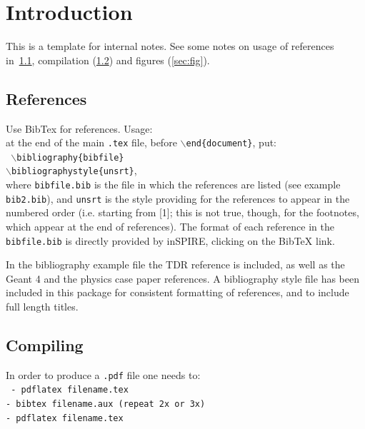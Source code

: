 \documentclass[preprint,prd,tightenlines]{revtex4}
\begin{document}
{\renewcommand{\thefootnote}{\fnsymbol{footnote}}}
\setcounter{footnote}{0}

\tableofcontents

\section{Introduction}

This is a template for {\belletwo} internal notes. See some notes on usage of 
references in~\ref{sec:ref}, compilation (\ref{sec:com}) and figures (\ref{sec:fig}). 

\subsection{References}
\label{sec:ref}

Use BibTex for references. Usage:\\
at the end of the main {\tt .tex} file, before {\tt $\backslash$end\{document\}}, 
put:\\
{\tt 
$\backslash$bibliography\{bibfile\}\\
$\backslash$bibliographystyle\{unsrt\}},\\
where {\tt bibfile.bib} is the file in which the references are listed (see example {\tt bib2.bib}), 
and {\tt unsrt} is the style providing for the references to appear in the numbered order 
(i.e. starting from [1]; this is not true, though, for the footnotes, which appear at the 
end of references). The format of each reference in the {\tt bibfile.bib} is directly provided 
by inSPIRE, clicking on the BibTeX link. 

In the bibliography example file the {\belletwo} TDR \cite{Abe:2010sj} reference is included, as well as 
the Geant 4 \cite{Agostinelli:2002hh} and the physics case paper \cite{Aushev:2010bq} references. A bibliography style file has been included in this package for consistent formatting of references, and to include full length titles.

\subsection{Compiling}
\label{sec:com}

In order to produce a {\tt .pdf} file one needs to:\\
{\tt 
- pdflatex filename.tex\\
- bibtex filename.aux (repeat 2x or 3x)\\
- pdflatex filename.tex\\
}
\end{document}
